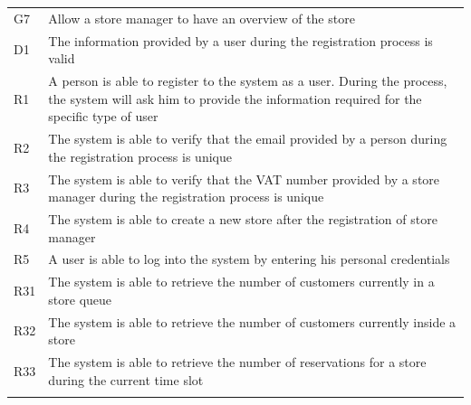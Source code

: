 \documentclass[
]{article}
\begin{document}
\begin{longtable}[]{@{}
  >{\raggedright\arraybackslash}p{}
  >{\raggedright\arraybackslash}p{}@{}}
\toprule
G7 & Allow a store manager to have an overview of the
store \\ \addlinespace
\midrule
\endhead
D1 & The information provided by a user during the registration process
is valid \\ \addlinespace
R1 & A person is able to register to the system as a user. During the
process, the system will ask him to provide the information required for
the specific type of user \\ \addlinespace
R2 & The system is able to verify that the email provided by a person
during the registration process is unique \\ \addlinespace
R3 & The system is able to verify that the VAT number provided by a
store manager during the registration process is unique \\ \addlinespace
R4 & The system is able to create a new store after the registration of
store manager \\ \addlinespace
R5 & A user is able to log into the system by entering his personal
credentials \\ \addlinespace
R31 & The system is able to retrieve the number of customers currently
in a store queue \\ \addlinespace
R32 & The system is able to retrieve the number of customers currently
inside a store \\ \addlinespace
R33 & The system is able to retrieve the number of reservations for a
store during the current time slot \\ \addlinespace
\bottomrule
\end{longtable}
\end{document}
